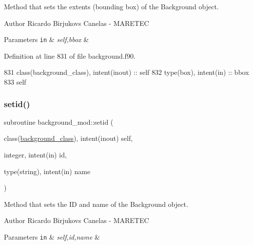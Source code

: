Method that sets the extents (bounding box) of the Background object. 

\begin{DoxyAuthor}{Author}
Ricardo Birjukovs Canelas -\/ M\+A\+R\+E\+T\+EC 
\end{DoxyAuthor}

\begin{DoxyParams}[1]{Parameters}
\mbox{\tt in}  & {\em self,bbox} & \\
\hline
\end{DoxyParams}


Definition at line 831 of file background.\+f90.


\begin{DoxyCode}
831     \textcolor{keywordtype}{class}(background\_class), \textcolor{keywordtype}{intent(inout)} :: self
832     \textcolor{keywordtype}{type}(box), \textcolor{keywordtype}{intent(in)} :: bbox
833     self%
\end{DoxyCode}
\mbox{\label{namespacebackground__mod_a4feaccf688558d8590ece4f09c65c977}} 
\subsubsection{\texorpdfstring{setid()}{setid()}}
{\footnotesize\ttfamily subroutine background\+\_\+mod\+::setid (\begin{DoxyParamCaption}\item[{class(\mbox{\hyperlink{structbackground__mod_1_1background__class}{background\+\_\+class}}), intent(inout)}]{self,  }\item[{integer, intent(in)}]{id,  }\item[{type(string), intent(in)}]{name }\end{DoxyParamCaption})\hspace{0.3cm}{\ttfamily [private]}}



Method that sets the ID and name of the Background object. 

\begin{DoxyAuthor}{Author}
Ricardo Birjukovs Canelas -\/ M\+A\+R\+E\+T\+EC 
\end{DoxyAuthor}

\begin{DoxyParams}[1]{Parameters}
\mbox{\tt in}  & {\em self,id,name} & \\
\hline
\end{DoxyParams}


